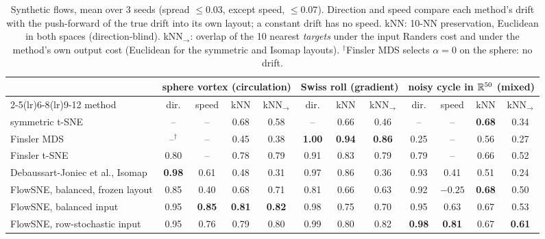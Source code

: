 \begin{table}[t]
  \caption{Synthetic flows, mean over 3 seeds (spread $\le0.03$, except speed,
  $\le0.07$). Direction and speed compare each method's drift with the
  push-forward of the true drift into its own layout; a constant drift has no
  speed. kNN: 10-NN preservation, Euclidean in both spaces (direction-blind).
  kNN$_\to$: overlap of the 10 nearest \emph{targets} under the input Randers
  cost and under the method's own output cost (Euclidean for the symmetric and
  Isomap layouts). $^\dagger$Finsler MDS selects $\alpha=0$ on
  the sphere: no drift.}
  \label{tab:toy}
  \centering
  \small
  \setlength{\tabcolsep}{3.5pt}
  \begin{tabular}{lccccccccccc}
    \toprule
    & \multicolumn{4}{c}{sphere vortex (circulation)} & \multicolumn{3}{c}{Swiss roll (gradient)}
    & \multicolumn{4}{c}{noisy cycle in $\mathbb{R}^{50}$ (mixed)} \\
    \cmidrule(lr){2-5}\cmidrule(lr){6-8}\cmidrule(lr){9-12}
    method & dir. & speed & kNN & kNN$_\to$ & dir. & kNN & kNN$_\to$ & dir. & speed & kNN & kNN$_\to$ \\
    \midrule
    symmetric t-SNE & -- & -- & 0.68 & 0.58 & -- & 0.66 & 0.46 & -- & -- & \textbf{0.68} & 0.34 \\
    Finsler MDS \citep{dages2025finsler} & --$^\dagger$ & -- & 0.45 & 0.38 & \textbf{1.00} & \textbf{0.94} & \textbf{0.86} & 0.25 & -- & 0.56 & 0.27 \\
    Finsler t-SNE \citep{dages2026harnessing} & 0.80 & -- & 0.78 & 0.79 & 0.91 & 0.83 & 0.79 & 0.79 & -- & 0.66 & 0.52 \\
    Debaussart-Joniec et al., Isomap & \textbf{0.98} & 0.61 & 0.48 & 0.31 & 0.97 & 0.86 & 0.36 & 0.93 & 0.41 & 0.51 & 0.24 \\
    FlowSNE, balanced, frozen layout & 0.85 & 0.40 & 0.68 & 0.71 & 0.81 & 0.66 & 0.63 & 0.92 & $-0.25$ & \textbf{0.68} & 0.50 \\
    FlowSNE, balanced input & 0.95 & \textbf{0.85} & \textbf{0.81} & \textbf{0.82} & 0.98 & 0.75 & 0.70 & 0.95 & 0.63 & 0.67 & 0.53 \\
    FlowSNE, row-stochastic input & 0.95 & 0.76 & 0.79 & 0.80 & 0.99 & 0.80 & 0.82 & \textbf{0.98} & \textbf{0.81} & 0.67 & \textbf{0.61} \\
    \bottomrule
  \end{tabular}
\end{table}

